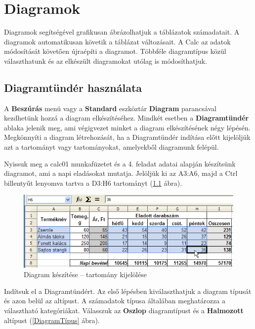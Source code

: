 \chapter{Diagramok}
\thispagestyle{empty}

Diagramok segítségével grafikusan ábrázolhatjuk a
táblázatok számadatait. A diagramok automatikusan követik a
táblázat változásait. A Calc az adatok módosítását
követően újraépíti a diagramot. Többféle diagramtípus
közül választhatunk és az elkészült diagramokat utólag is
módosíthatjuk.


\section{Diagramtündér használata}

A \textbf{Beszúrás} menü vagy a \textbf{Standard} eszköztár
\textbf{Diagram} parancsával kezdhetünk hozzá a diagram
elkészítéséhez. Mindkét esetben a \textbf{Diagramtündér}
ablaka jelenik meg, ami végigvezet minket a diagram
elkészítésének négy lépésén. Megkönnyíti a diagram
létrehozását, ha a Diagramtündér indítása előtt
kijelöljük azt a tartományt vagy tartományokat, amelyekből
diagramunk felépül.

Nyissuk meg a calc01 munkafüzetet és a 4. feladat adatai alapján
készítsünk diagramot, ami a napi eladásokat mutatja.
Jelöljük ki az A3:A6, majd a Ctrl billentyűt lenyomva tartva a
D3:H6 tartományt (\ref{DiagramTartomány} ábra).

\begin{figure}[!h]
\begin{center}
\includegraphics[width=15.159cm]{oocalcv1-img52.png}
\caption{Diagram készítése -- tartomány kijelölése}\label{DiagramTartomány}
\end{center}
\end{figure}

Indítsuk el a Diagramtündért. Az első lépésben
kiválaszthatjuk a diagram típusát és azon belül az
altípust. A számadatok típusa általában meghatározza a
választható kategóriákat. Válasszuk az \textbf{Oszlop}
diagramtípust és a \textbf{Halmozott} altípust (\ref{DiagramTípus} ábra).

